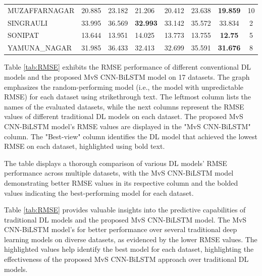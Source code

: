 \documentclass[a4paper,fleqn]{cas-sc}
\begin{document}
\begin{table}[]
{\begin{tabular}{llllllcc}
 MUZAFFARNAGAR  & 20.885          & 23.182    & 21.206          & 20.412     & 23.638                   & \textbf{19.859} & 10     \\
 SINGRAULI      & 33.995          & 36.569    & \textbf{32.993} & 33.142     & 35.572                    & 33.834          & 2      \\
 SONIPAT        & 13.644          & 13.951    & 14.025          & 13.773     & 13.755                    & \textbf{12.75}  & 5      \\
 YAMUNA\_NAGAR  & 31.985          & 36.433    & 32.413          & 32.699     & 35.591                    & \textbf{31.676} & 8     \\ \hline
  \end{tabular}%
  }
  \end{table}
  Table \ref{tab:RMSE} exhibits the RMSE performance of different conventional DL models and the proposed MvS CNN-BiLSTM model on 17 datasets. The graph emphasizes the random-performing model (i.e., the model with unpredictable RMSE) for each dataset using strikethrough text. The leftmost column lists the names of the evaluated datasets, while the next columns represent the RMSE values of different traditional DL models on each dataset. The proposed MvS CNN-BiLSTM model's RMSE values are displayed in the "MvS CNN-BiLSTM" column. The "Best-view" column identifies the DL model that achieved the lowest RMSE on each dataset, highlighted using bold text.

  The table displays a thorough comparison of various DL models' RMSE performance across multiple datasets, with the MvS CNN-BiLSTM model demonstrating better RMSE values in its respective column and the bolded values indicating the best-performing model for each dataset.
  
  Table \ref{tab:RMSE} provides valuable insights into the predictive capabilities of traditional DL models and the proposed MvS CNN-BiLSTM model. The MvS CNN-BiLSTM model's for better performance over several traditional deep learning models on diverse datasets, as evidenced by the lower RMSE values. The highlighted values help identify the best model for each dataset, highlighting the effectiveness of the proposed MvS CNN-BiLSTM approach over traditional DL models.
\end{document}
